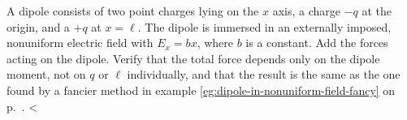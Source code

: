 A dipole consists of two point charges lying on the $x$ axis,                                                     
a charge $-q$ at the origin, and a $+q$ at $x=\ell$.  The dipole is                                               
immersed in an externally imposed, nonuniform electric field with $E_x=bx$, where
$b$ is a constant. Add the forces acting on the dipole. Verify that
the total force depends only on the dipole moment, not on $q$ or $\ell$ individually,
and that the result is the same as the one found by a fancier method in example                                   
\ref{eg:dipole-in-nonuniform-field-fancy} on p.~\pageref{eg:dipole-in-nonuniform-field-fancy}.                    
<%

